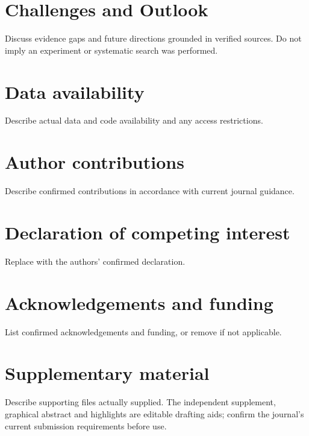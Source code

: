 \documentclass[a4paper,preprint,12pt]{elsarticle}
\begin{document}
\section{Challenges and Outlook}\label{sec:outlook}
Discuss evidence gaps and future directions grounded in verified sources.
Do not imply an experiment or systematic search was performed.

\section*{Data availability}
Describe actual data and code availability and any access restrictions.
\section*{Author contributions}
Describe confirmed contributions in accordance with current journal guidance.
\section*{Declaration of competing interest}
Replace with the authors' confirmed declaration.
\section*{Acknowledgements and funding}
List confirmed acknowledgements and funding, or remove if not applicable.
\section*{Supplementary material}
Describe supporting files actually supplied. The independent supplement,
graphical abstract and highlights are editable drafting aids; confirm the
journal's current submission requirements before use.


\end{document}
